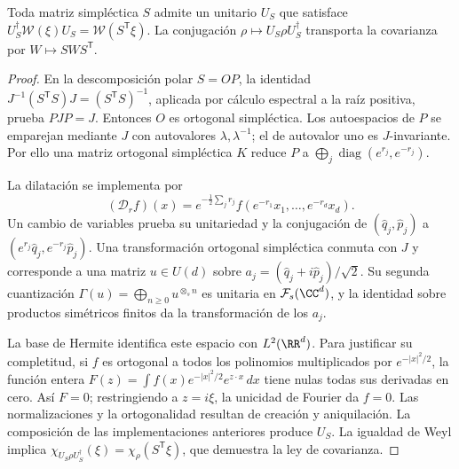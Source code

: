 \begin{lemma}
\label{x_reciprocidad:app:lem:implementacion-simplectica}
Toda matriz simpléctica \(S\) admite un unitario \(U_S\) que satisface
\(U_S^\dagger\mathcal W(\xi)U_S=\mathcal W(S^{\mathsf T}\xi)\).
La conjugación \(\rho\mapsto U_S\rho U_S^\dagger\) transporta
la covarianza por \(W\mapsto SWS^{\mathsf T}\).
\end{lemma}
\begin{proof}
En la descomposición polar \(S=OP\), la identidad
\(J^{-1}(S^{\mathsf T}S)J=(S^{\mathsf T}S)^{-1}\), aplicada por
cálculo espectral a la raíz positiva, prueba \(PJP=J\).
Entonces \(O\) es ortogonal simpléctica. Los autoespacios de \(P\)
se emparejan mediante \(J\) con autovalores \(\lambda,\lambda^{-1}\);
el de autovalor uno es \(J\)-invariante. Por ello una matriz
ortogonal simpléctica \(K\) reduce \(P\) a
\(\bigoplus_j\operatorname{diag}(e^{r_j},e^{-r_j})\).

La dilatación se implementa por
\[
 (\mathcal D_rf)(x)=e^{-\frac12\sum_jr_j}
 f(e^{-r_1}x_1,\ldots,e^{-r_d}x_d).
\]
Un cambio de variables prueba su unitariedad y la conjugación de
\((\widehat q_j,\widehat p_j)\) a
\((e^{r_j}\widehat q_j,e^{-r_j}\widehat p_j)\).
Una transformación ortogonal simpléctica conmuta con \(J\) y
corresponde a una matriz \(u\in U(d)\) sobre
\(a_j=(\widehat q_j+i\widehat p_j)/\sqrt2\). Su segunda
cuantización \(\Gamma(u)=\bigoplus_{n\geq0}u^{\otimes_s n}\)
es unitaria en \(\mathcal F_s(\CC^d)\), y la identidad sobre
productos simétricos finitos da la transformación de los \(a_j\).

La base de Hermite identifica este espacio con \(L^2(\RR^d)\).
Para justificar su completitud, si \(f\) es ortogonal a todos los
polinomios multiplicados por \(e^{-|x|^2/2}\), la función entera
\(F(z)=\int f(x)e^{-|x|^2/2}e^{z\cdot x}\,dx\) tiene nulas
todas sus derivadas en cero. Así \(F=0\); restringiendo a
\(z=i\xi\), la unicidad de Fourier da \(f=0\). Las
normalizaciones y la ortogonalidad resultan de creación y aniquilación.
La composición de las implementaciones anteriores produce \(U_S\).
La igualdad de Weyl implica
\(\chi_{U_S\rho U_S^\dagger}(\xi)=\chi_\rho(S^{\mathsf T}\xi)\),
que demuestra la ley de covarianza.
\end{proof}

